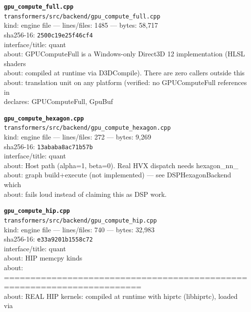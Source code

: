 \noindent\textbf{\texttt{gpu\_compute\_full.cpp}}\\
\texttt{transformers/src/backend/gpu\_compute\_full.cpp}\\
kind: engine file --- lines/files: 1485 --- bytes: 58,717\\
sha256-16: \texttt{2500c19e25f46cf4}\\
interface/title: quant\\
about: GPUComputeFull is a Windows-only Direct3D 12 implementation (HLSL shaders\\
about: compiled at runtime via D3DCompile). There are zero callers outside this\\
about: translation unit on any platform (verified: no GPUComputeFull references in\\
declares: GPUComputeFull, GpuBuf\\
\vspace*{6.0pt}

\noindent\textbf{\texttt{gpu\_compute\_hexagon.cpp}}\\
\texttt{transformers/src/backend/gpu\_compute\_hexagon.cpp}\\
kind: engine file --- lines/files: 272 --- bytes: 9,269\\
sha256-16: \texttt{13ababa8ac71b57b}\\
interface/title: quant\\
about: Host path (alpha=1, beta=0). Real HVX dispatch needs hexagon\_nn\_\\
about: graph build+execute (not implemented) — see DSPHexagonBackend which\\
about: fails loud instead of claiming this as DSP work.\\
\vspace*{6.0pt}

\noindent\textbf{\texttt{gpu\_compute\_hip.cpp}}\\
\texttt{transformers/src/backend/gpu\_compute\_hip.cpp}\\
kind: engine file --- lines/files: 740 --- bytes: 32,983\\
sha256-16: \texttt{e33a9201b1558c72}\\
interface/title: quant\\
about: HIP memcpy kinds\\
about: ========================================================================\\
about: REAL HIP kernels: compiled at runtime with hiprtc (libhiprtc), loaded via\\
\vspace*{6.0pt}

